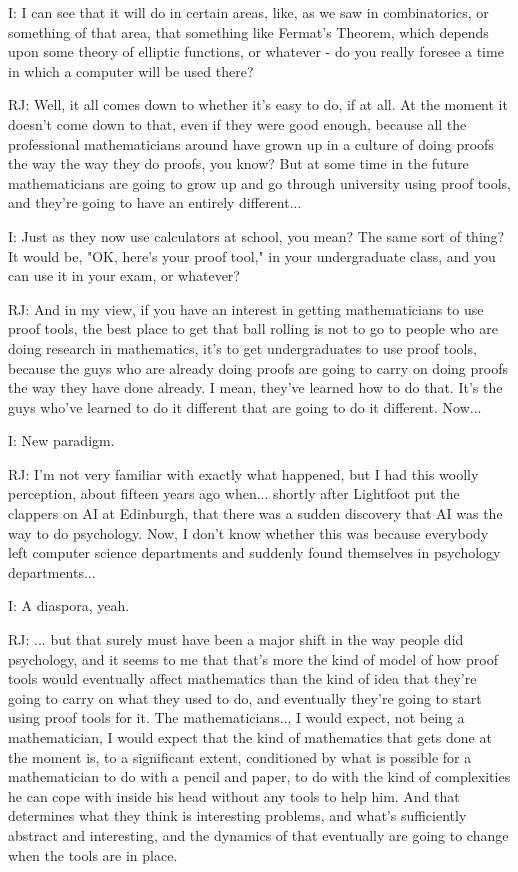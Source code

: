 \documentclass[10pt,titlepage]{book}
\begin{document}
I: I can see that it will do in certain areas, like, as we saw in combinatorics, or something of that area, that something like Fermat's Theorem, which depends upon some theory of elliptic functions, or whatever - do you really foresee a time in which a computer will be used there?

RJ: Well, it all comes down to whether it's easy to do, if at all. At the moment it doesn't come down to that, even if they were good enough, because all the professional mathematicians around have grown up in a culture of doing proofs the way the way they do proofs, you know? But at some time in the future mathematicians are going to grow up and go through university using proof tools, and they're going to have an entirely different...

I: Just as they now use calculators at school, you mean? The same sort of thing? It would be, "OK, here's your proof tool," in your undergraduate class, and you can use it in your exam, or whatever?

RJ: And in my view, if you have an interest in getting mathematicians to use proof tools, the best place to get that ball rolling is not to go to people who are doing research in mathematics, it's to get undergraduates to use proof tools, because the guys who are already doing proofs are going to carry on doing proofs the way they have done already. I mean, they've learned how to do that. It's the guys who've learned to do it different that are going to do it different. Now...

I: New paradigm.

RJ: I'm not very familiar with exactly what happened, but I had this woolly perception, about fifteen years ago when... shortly after Lightfoot put the clappers on AI at Edinburgh, that there was a sudden discovery that AI was the way to do psychology. Now, I don't know whether this was because everybody left computer science departments and suddenly found themselves in psychology departments...

I: A diaspora, yeah.

RJ: ... but that surely must have been a major shift in the way people did psychology, and it seems to me that that's more the kind of model of how proof tools would eventually affect mathematics than the kind of idea that they're going to carry on what they used to do, and eventually they're going to start using proof tools for it. The mathematicians... I would expect, not being a mathematician, I would expect that the kind of mathematics that gets done at the moment is, to a significant extent, conditioned by what is possible for a mathematician to do with a pencil and paper, to do with the kind of complexities he can cope with inside his head without any tools to help him. And that determines what they think is interesting problems, and what's sufficiently abstract and interesting, and the dynamics of that eventually are going to change when the tools are in place.
\end{document}
